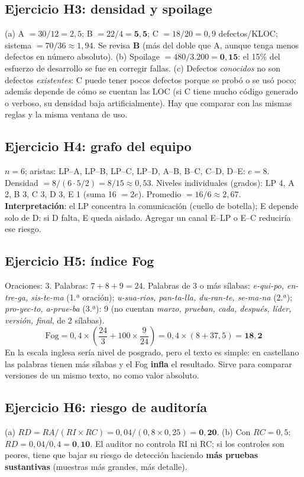 \documentclass[11pt,a4paper]{article}
\begin{document}
\subsection*{Ejercicio H3: densidad y spoilage}
(a) A $= 30/12 = 2{,}5$; B $= 22/4 = \mathbf{5{,}5}$; C $= 18/20 = 0{,}9$ defectos/KLOC; sistema $= 70/36 \approx 1{,}94$.
Se revisa \textbf{B} (más del doble que A, aunque tenga menos defectos en número absoluto). (b) Spoilage $= 480/3.200 =
\mathbf{0{,}15}$: el 15\% del esfuerzo de desarrollo se fue en corregir fallas. (c) Defectos \emph{conocidos} no
son defectos \emph{existentes}: C puede tener pocos defectos porque se probó o se usó poco; además depende de cómo se
cuentan las LOC (si C tiene mucho código generado o verboso, su densidad baja artificialmente). Hay que comparar con
las mismas reglas y la misma ventana de uso.

\subsection*{Ejercicio H4: grafo del equipo}
$n = 6$; aristas: LP--A, LP--B, LP--C, LP--D, A--B, B--C, C--D, D--E: $e = 8$. Densidad $= 8/(6 \cdot 5/2) = 8/15
\approx 0{,}53$. Niveles individuales (grados): LP 4, A 2, B 3, C 3, D 3, E 1 (suma 16 $= 2e$). Promedio $= 16/6
\approx 2{,}67$. \textbf{Interpretación}: el LP concentra la comunicación (cuello de botella); E depende solo de
D: si D falta, E queda aislado. Agregar un canal E--LP o E--C reduciría ese riesgo.

\subsection*{Ejercicio H5: índice Fog}
Oraciones: 3. Palabras: $7 + 8 + 9 = 24$. Palabras de 3 o más sílabas: \emph{e-qui-po, en-tre-ga, sis-te-ma} (1.ª
oración); \emph{u-sua-rios, pan-ta-lla, du-ran-te, se-ma-na} (2.ª); \emph{pro-yec-to, a-prue-ba} (3.ª): 9 (no
cuentan \emph{marzo, prueban, cada, después, líder, versión, final}, de 2 sílabas).
\[ \text{Fog} = 0{,}4 \times \left(\frac{24}{3} + 100 \times \frac{9}{24}\right) = 0{,}4 \times (8 + 37{,}5) = \mathbf{18{,}2} \]
En la escala inglesa sería nivel de posgrado, pero el texto es simple: en castellano las palabras tienen más sílabas
y el Fog \textbf{infla} el resultado. Sirve para comparar versiones de un mismo texto, no como valor absoluto.

\subsection*{Ejercicio H6: riesgo de auditoría}
(a) $RD = RA/(RI \times RC) = 0{,}04/(0{,}8 \times 0{,}25) = \mathbf{0{,}20}$. (b) Con $RC = 0{,}5$: $RD =
0{,}04/0{,}4 = \mathbf{0{,}10}$. El auditor no controla RI ni RC; si los controles son peores, tiene que bajar su
riesgo de detección haciendo \textbf{más pruebas sustantivas} (muestras más grandes, más detalle).
\end{document}
